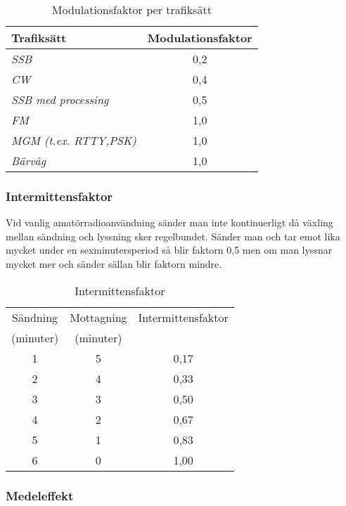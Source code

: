\begin{table}[H]
  \begin{center}
    \begin{tabular}{lc}
	\textbf{Trafiksätt} & \textbf{Modulationsfaktor} \\ 
	\hline
	\emph{SSB} & 0,2 \\ 
	\emph{CW} & 0,4 \\ 
	\emph{SSB med processing} & 0,5 \\ 
	\emph{FM} & 1,0 \\ 
	\emph{MGM (t.ex. RTTY,PSK)} & 1,0 \\ 
	\emph{Bärvåg} & 1,0 \\ 
    \end{tabular}
    \caption{Modulationsfaktor per trafiksätt}
    \label{tab:modfakt}
  \end{center}
\end{table}
  
\subsubsection{Intermittensfaktor}

Vid vanlig amatörradioanvändning sänder man inte kontinuerligt då växling
mellan sändning och lyssning sker regelbundet.
Sänder man och tar emot lika mycket under en sexminutersperiod så blir faktorn
0,5 men om man lyssnar mycket mer och sänder sällan blir faktorn mindre.

\begin{table}[H]
  \begin{center}
    \begin{tabular}{|c|c|c|}
	\hline
	Sändning  & Mottagning & Intermittensfaktor \\
	(minuter) & (minuter)  & \\ \hline
	1 & 5 & 0,17 \\ \hline
	2 & 4 & 0,33 \\ \hline
	3 & 3 & 0,50 \\ \hline
	4 & 2 & 0,67 \\ \hline
	5 & 1 & 0,83 \\ \hline
	6 & 0 & 1,00 \\ \hline
    \end{tabular}
    \caption{Intermittensfaktor}
    \label{tab:intfakt}
  \end{center}
\end{table}

\subsubsection{Medeleffekt}

